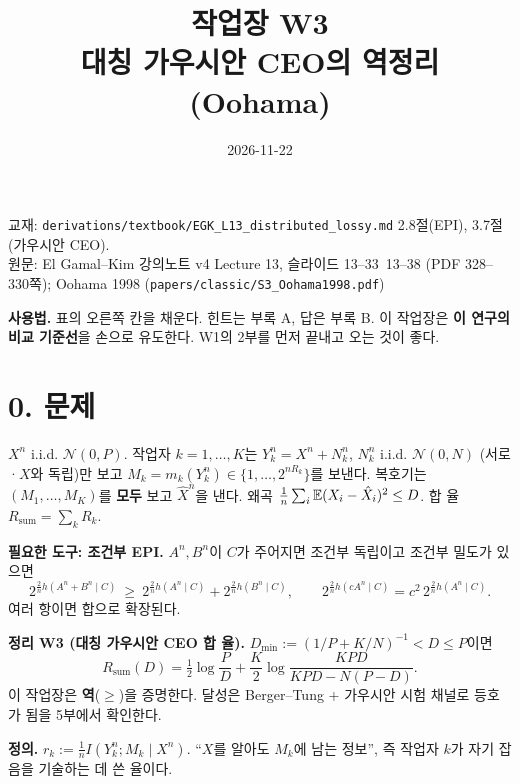 
\title{\sffamily 작업장 W3\\[2pt]\large 대칭 가우시안 CEO의 역정리 (Oohama)}
\author{}
\date{2026-11-22}

\maketitle
\vspace{-2.5em}
\begin{center}\small
교재: \texttt{derivations/textbook/EGK\_L13\_distributed\_lossy.md} 2.8절(EPI), 3.7절(가우시안 CEO).\\
원문: El Gamal–Kim 강의노트 v4 Lecture 13, 슬라이드 13–33~13–38 (PDF 328–330쪽); Oohama 1998 (\texttt{papers/classic/S3\_Oohama1998.pdf})
\end{center}

\textbf{사용법.} 표의 오른쪽 칸을 채운다. 힌트는 부록 A, 답은 부록 B. 이 작업장은 \textbf{이 연구의 비교 기준선}을 손으로 유도한다. W1의 2부를 먼저 끝내고 오는 것이 좋다.

\section*{0. 문제}
$X^n$ i.i.d. $\mathcal N(0,P)$. 작업자 $k=1,\dots,K$는 $Y_k^n=X^n+N_k^n$, $N_k^n$ i.i.d. $\mathcal N(0,N)$ (서로·$X$와 독립)만 보고 $M_k=m_k(Y_k^n)\in\{1,\dots,2^{nR_k}\}$를 보낸다. 복호기는 $(M_1,\dots,M_K)$를 \textbf{모두} 보고 $\hat X^n$을 낸다. 왜곡 $\frac1n\sum_i\mathbb{E}(X_i-\hat X_i)^2\le D$. 합 율 $R_{\mathrm{sum}}=\sum_kR_k$.

\textbf{필요한 도구: 조건부 EPI.} $A^n,B^n$이 $C$가 주어지면 조건부 독립이고 조건부 밀도가 있으면
\[
2^{\frac2n h(A^n+B^n\mid C)}\ \ge\ 2^{\frac2nh(A^n\mid C)}+2^{\frac2nh(B^n\mid C)},\qquad
2^{\frac2nh(cA^n\mid C)}=c^2\,2^{\frac2nh(A^n\mid C)}.
\]
여러 항이면 합으로 확장된다.

\begin{thmbox}
\textbf{정리 W3 (대칭 가우시안 CEO 합 율).} $D_{\min}:=(1/P+K/N)^{-1}<D\le P$이면
\[
R_{\mathrm{sum}}(D)=\tfrac12\log\frac PD+\frac K2\log\frac{KPD}{KPD-N(P-D)}.
\]
이 작업장은 \textbf{역}($\ge$)을 증명한다. 달성은 Berger–Tung + 가우시안 시험 채널로 등호가 됨을 5부에서 확인한다.
\end{thmbox}

\textbf{정의.} $r_k:=\frac1nI(Y_k^n;M_k\mid X^n)$. “$X$를 알아도 $M_k$에 남는 정보”, 즉 작업자 $k$가 자기 잡음을 기술하는 데 쓴 율이다.

